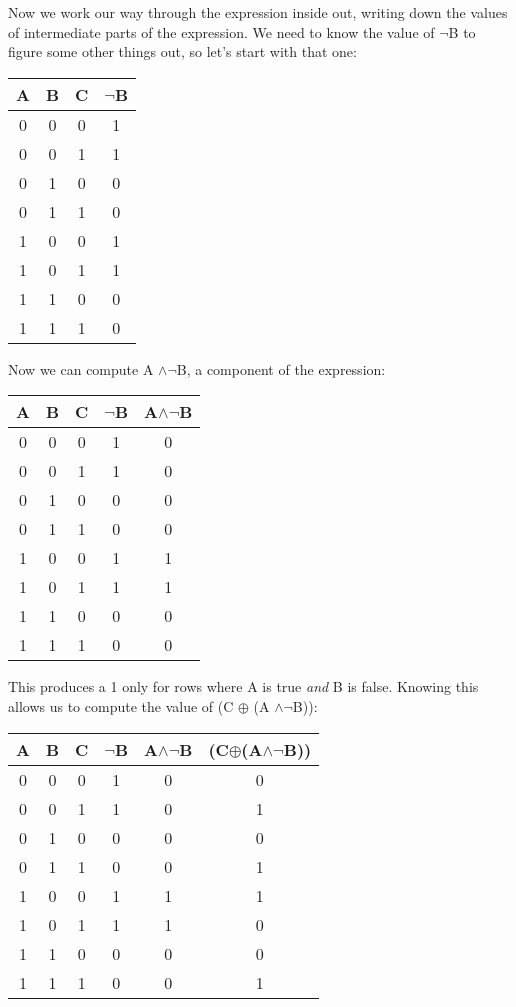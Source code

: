 Now we work our way through the expression inside out, writing down the
values of intermediate parts of the expression. We need to know the value
of $\neg$B to figure some other things out, so let's start with that one:
\begin{nobreak}
\begin{center}
\begin{tabular}{c c c|c}
A & B & C & $\neg$B \\
\hline
0 & 0 & 0 & 1 \\
0 & 0 & 1 & 1 \\
0 & 1 & 0 & 0 \\
0 & 1 & 1 & 0 \\
1 & 0 & 0 & 1 \\
1 & 0 & 1 & 1 \\
1 & 1 & 0 & 0 \\
1 & 1 & 1 & 0 \\
\end{tabular}
\end{center}
\end{nobreak}
\begin{nobreak}
Now we can compute A $\wedge \neg$B, a component of the expression:
\begin{center}
\begin{tabular}{c c c|c c}
A & B & C & $\neg$B & A$\wedge \neg$B\\
\hline
0 & 0 & 0 & 1 & 0 \\
0 & 0 & 1 & 1 & 0 \\
0 & 1 & 0 & 0 & 0 \\
0 & 1 & 1 & 0 & 0 \\
1 & 0 & 0 & 1 & 1 \\
1 & 0 & 1 & 1 & 1 \\
1 & 1 & 0 & 0 & 0 \\
1 & 1 & 1 & 0 & 0 \\
\end{tabular}
\end{center}
\end{nobreak}
This produces a 1 only for rows where A is true \textit{and} B is false.
Knowing this allows us to compute the value of (C $\oplus$ (A $\wedge
\neg$B)):
\begin{nobreak}
\begin{center}
\begin{tabular}{c c c|c c c}
A & B & C & $\neg$B & A$\wedge \neg$B & (C$\oplus$(A$\wedge \neg$B)) \\
\hline
0 & 0 & 0 & 1 & 0 & 0 \\
0 & 0 & 1 & 1 & 0 & 1 \\
0 & 1 & 0 & 0 & 0 & 0 \\
0 & 1 & 1 & 0 & 0 & 1 \\
1 & 0 & 0 & 1 & 1 & 1 \\
1 & 0 & 1 & 1 & 1 & 0 \\
1 & 1 & 0 & 0 & 0 & 0 \\
1 & 1 & 1 & 0 & 0 & 1 \\
\end{tabular}
\end{center}
\end{nobreak}
